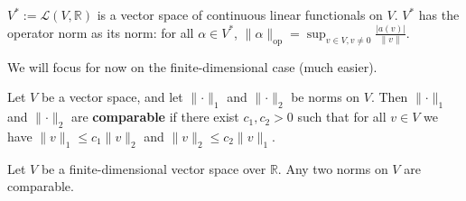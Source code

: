 \begin{definition}

\(V^* := \mathcal{L}(V, \mathbb{R})\) is a vector space of continuous linear functionals on \(V\). \(V^*\) has the operator norm as its norm: for all \(\alpha \in V^*\), \(\lVert \alpha \rVert_{\text{op}} = \sup_{v \in V, v \neq 0} \frac{ |a(v)|}{\lVert v \rVert}\). 

\end{definition}

We will focus for now on the finite-dimensional case (much easier).

\begin{definition}

Let \(V\) be a vector space, and let \(\lVert \cdot \rVert_1\) and \(\lVert \cdot \rVert_2\) be norms on \(V\). Then \(\lVert \cdot \rVert_1\) and \(\lVert \cdot \rVert_2\) are \textbf{comparable} if there exist \(c_1, c_2 > 0\) such that for all \(v \in V\) we have \(\lVert v \rVert_1 \leq c_1 \lVert v \rVert_2\) and \(\lVert v \rVert_2 \leq c_2 \lVert v \rVert_1\).

\end{definition}

\begin{theorem}\label{ra.linalg.comp.norms}

Let \(V\) be a finite-dimensional vector space over \(\mathbb{R}\). Any two norms on \(V\) are comparable.

\end{theorem}

